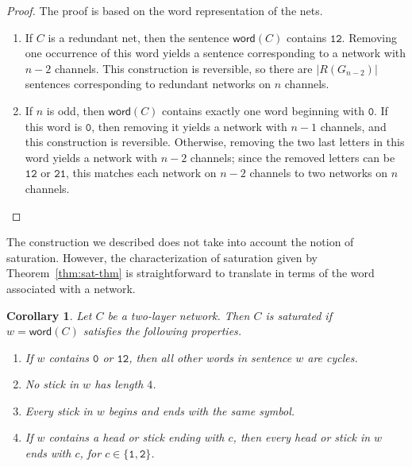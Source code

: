 \documentclass[10pt]{IEEEtran}
\newcommand{\word}{\mathsf{word}}
\newcommand{\sent}[1]{\ensuremath{\mathtt{#1}}} \newcommand{\GG}{{\cal G}}
\newtheorem{corollary}{Corollary}
\begin{document}
\begin{proof}
  The proof is based on the word representation of the nets.
  \begin{enumerate}
  \item If $C$ is a redundant net, then the sentence $\word(C)$ contains $\sent{12}$.
    Removing one occurrence of this word yields a sentence corresponding to a
    network with $n-2$ channels.  This construction is reversible, so there are
    $|R(G_{n-2})|$ sentences corresponding to redundant networks on $n$ channels.

  \item If $n$ is odd, then $\word(C)$ contains exactly one word beginning with
    \sent{0}.  If this word is \sent{0}, then removing it yields a network with
    $n-1$ channels, and this construction is reversible.  Otherwise, removing the
    two last letters in this word yields a network with $n-2$ channels; since the
    removed letters can be \sent{12} or \sent{21}, this matches each network
    on $n-2$ channels to two networks on $n$ channels.
  \end{enumerate}
\end{proof}\bigskip



The construction we described does not take into account the notion of
saturation.  However,
the characterization of saturation given by Theorem~\ref{thm:sat-thm} is
straightforward to translate in terms of the word associated with a network.
\begin{corollary}
  Let $C$ be a two-layer network. Then $C$ is
  saturated if $w=\word(C)$ satisfies the following properties.
  \begin{enumerate}
  \item If $w$ contains \sent{0} or $\sent{12}$, then all other words
    in sentence $w$ are cycles.
  \item No stick in $w$ has length $4$.
  \item Every stick in $w$ begins and ends with the same symbol.
  \item If $w$ contains a head or stick ending with $c$, then every head or stick in $w$ ends with $c$, for $c\in\{\sent{1},\sent{2}\}$.
  \end{enumerate}
\end{corollary}
\end{document}
